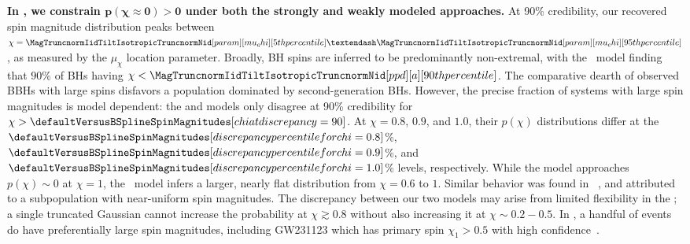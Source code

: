 \textbf{In \gwtcfour, we constrain $\bm{p(\chi\approx 0) > 0}$ under both the strongly and weakly modeled approaches.}
At 90\% credibility, our recovered spin magnitude distribution peaks between $\chi=\CIBoundsDash{\MagTruncnormIidTiltIsotropicTruncnormNid[param][mu_chi]}$, as measured by the $\mu_{\chi}$ location parameter.
Broadly, \ac{BH} spins are inferred to be predominantly non-extremal, with the ~model finding that $90\%$ of \acp{BH} having $\chi<\MagTruncnormIidTiltIsotropicTruncnormNid[ppd][a][90th percentile]$.
The comparative dearth of observed \acp{BBH} with large spins disfavors a population dominated by second-generation \acp{BH}. 
However, the precise fraction of systems with large spin magnitudes is model dependent: the  and \BSpline models only disagree at 90\% credibility for $\chi > \defaultVersusBSplineSpinMagnitudes[chi at discrepancy=90]$.
At $\chi = 0.8$, $0.9$, and $1.0$, their $p(\chi)$ distributions differ at the $\defaultVersusBSplineSpinMagnitudes[discrepancy percentile for chi=0.8]$\%, $\defaultVersusBSplineSpinMagnitudes[discrepancy percentile for chi=0.9]$\%, and $\defaultVersusBSplineSpinMagnitudes[discrepancy percentile for chi=1.0]$\% levels, respectively.
While the  model approaches $p(\chi)\sim 0$ at $\chi=1$,
the \BSpline~model infers a larger, nearly flat distribution from $\chi=0.6$ to $1$. 
Similar behavior was found in \gwtcthree~\citep{Godfrey:2023oxb}, and attributed to a subpopulation with near-uniform spin magnitudes.
The discrepancy between our two models may arise from limited flexibility in the \parametric; a single truncated Gaussian cannot increase the probability at $\chi \gtrsim 0.8$ without also increasing it at $\chi\sim 0.2{-}0.5$. 
In \gwtcfour, a handful of events do have preferentially large spin magnitudes, including GW231123 which has primary spin $\chi_1 > 0.5$ with high confidence~\citep{GW231123}.

